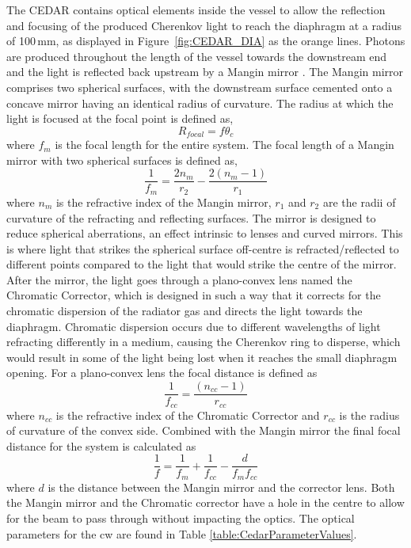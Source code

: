 \documentclass[../../main.tex]{subfiles}
\begin{document}
    The \gls{CEDAR} contains optical elements inside the vessel to allow the reflection and focusing of the produced Cherenkov light to reach the diaphragm at a radius of 100\,mm, as displayed in Figure~\ref{fig:CEDAR_DIA} as the orange lines. 
    Photons are produced throughout the length of the vessel towards the downstream end and the light is reflected back upstream by a Mangin mirror \cite{Riedl:74}. The Mangin mirror comprises two spherical surfaces, with the downstream surface cemented onto a concave mirror having an identical radius of curvature.
    The radius at which the light is focused at the focal point is defined as, 
    \begin{equation}
        R_{focal} = f \theta_c
    \end{equation}
    where $f_m$ is the focal length for the entire system. The focal length of a Mangin mirror with two spherical surfaces is defined as, 
    \begin{equation} 
        \frac{1}{f_m} = \frac{2n_m}{r_2} - \frac{2(n_m - 1)}{r_1} 
    \end{equation}
    where $n_m$ is the refractive index of the Mangin mirror, $r_1$ and $r_2$ are the radii of curvature of the refracting and reflecting surfaces. 
    The mirror is designed to reduce spherical aberrations, an effect intrinsic to lenses and curved mirrors. This is where light that strikes the spherical surface off-centre is refracted/reflected
    to different points compared to the light that would strike the centre of the mirror. After the mirror, the light goes through a plano-convex lens named the Chromatic Corrector, which is designed in such a way that it corrects for the chromatic dispersion of the radiator gas
    and directs the light towards the diaphragm. 
    Chromatic dispersion occurs due to different wavelengths of light refracting differently in a medium, causing the Cherenkov ring to disperse, which would result in some of the light being lost when it reaches the small diaphragm opening. For a plano-convex lens the focal distance is defined as 
    \begin{equation}
        \frac{1}{f_{cc}} = \frac{(n_{cc}-1)}{r_{cc}}
    \end{equation}
    where $n_{cc}$ is the refractive index of the Chromatic Corrector and $r_{cc}$ is the radius of curvature of the convex side. Combined with the Mangin mirror the final focal distance for the system is calculated as
    \begin{equation}
        \frac{1}{f} = \frac{1}{f_m} + \frac{1}{f_{cc}} - \frac{d}{f_{m}f_{cc}}
    \end{equation}
    where $d$ is the distance between the Mangin mirror and the corrector lens. Both the Mangin mirror and the Chromatic corrector have a hole in the centre to allow for the beam to pass through without impacting the optics. The optical parameters for the \gls{cw} are found in Table \ref{table:CedarParameterValues}.
    
\end{document}
